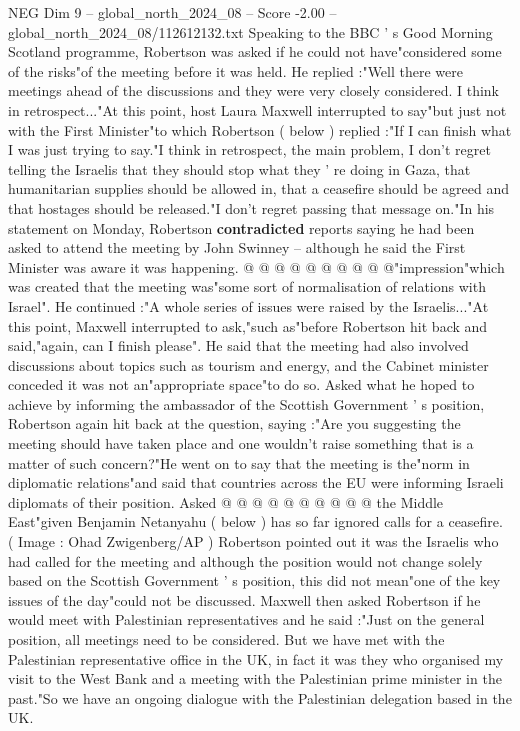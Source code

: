 \begin{textsample}{NEG Dim 9 – global\_north\_2024\_08 – Score -2.00 – global\_north\_2024\_08/112612132.txt}  \label{ex:f9_neg_257}
Speaking to the BBC ' s Good Morning Scotland programme, Robertson was asked if he could not have"considered some of the risks"of the meeting before it was held.
He replied :"Well there were meetings ahead of the discussions and they were very closely considered.
I think in retrospect..."At this point, host Laura Maxwell interrupted to say"but just not with the First Minister"to which Robertson ( below ) replied :"If I can finish what I was just trying to say."I think in retrospect, the main problem, I don't regret telling the Israelis that they should stop what they ' re doing in Gaza, that humanitarian supplies should be allowed in, that a ceasefire should be agreed and that hostages should be released."I don't regret passing that message on."In his statement on Monday, Robertson \textbf{contradicted} reports saying he had been asked to attend the meeting by John Swinney -- although he said the First Minister was aware it was happening. @ @ @ @ @ @ @ @ @ @"impression"which was created that the meeting was"some sort of normalisation of relations with Israel".
He continued :"A whole series of issues were raised by the Israelis..."At this point, Maxwell interrupted to ask,"such as"before Robertson hit back and said,"again, can I finish please".
He said that the meeting had also involved discussions about topics such as tourism and energy, and the Cabinet minister conceded it was not an"appropriate space"to do so.
Asked what he hoped to achieve by informing the ambassador of the Scottish Government ' s position, Robertson again hit back at the question, saying :"Are you suggesting the meeting should have taken place and one wouldn't raise something that is a matter of such concern?"He went on to say that the meeting is the"norm in diplomatic relations"and said that countries across the EU were informing Israeli diplomats of their position.
Asked @ @ @ @ @ @ @ @ @ @ the Middle East"given Benjamin Netanyahu ( below ) has so far ignored calls for a ceasefire. ( Image : Ohad Zwigenberg/AP ) Robertson pointed out it was the Israelis who had called for the meeting and although the position would not change solely based on the Scottish Government ' s position, this did not mean"one of the key issues of the day"could not be discussed.
Maxwell then asked Robertson if he would meet with Palestinian representatives and he said :"Just on the general position, all meetings need to be considered.
But we have met with the Palestinian representative office in the UK, in fact it was they who organised my visit to the West Bank and a meeting with the Palestinian prime minister in the past."So we have an ongoing dialogue with the Palestinian delegation based in the UK.

\end{textsample}
